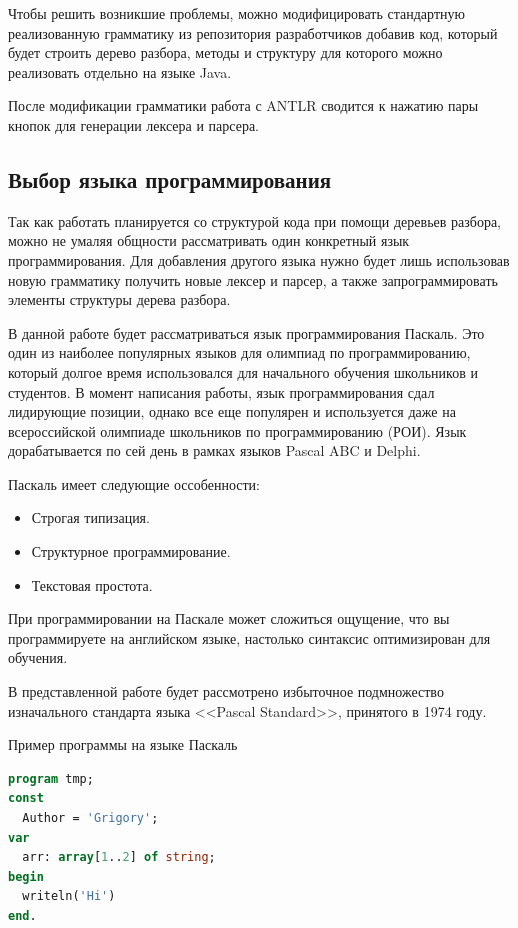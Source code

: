 Чтобы решить возникшие проблемы, можно модифицировать стандартную реализованную грамматику из репозитория разработчиков
добавив код, который будет строить дерево разбора, методы и структуру для которого можно реализовать отдельно на языке
Java.

После модификации грамматики работа с ANTLR сводится к нажатию пары кнопок для генерации лексера и парсера. 

\subsection{Выбор языка программирования}

Так как работать планируется со структурой кода при помощи деревьев разбора, можно не умаляя общности рассматривать один
конкретный язык программирования. Для добавления другого языка нужно будет лишь использовав новую грамматику получить новые лексер
и парсер, а также запрограммировать элементы структуры дерева разбора.

В данной работе будет рассматриваться язык программирования Паскаль. Это один из наиболее популярных языков для олимпиад
по программированию, который долгое время использовался для начального обучения школьников и студентов. В момент написания
работы, язык программирования сдал лидирующие позиции, однако все еще популярен и используется даже на всероссийской олимпиаде
школьников по программированию (РОИ). Язык дорабатывается по сей день в рамках языков Pascal ABC и Delphi.

Паскаль имеет следующие оссобенности:
\begin{itemize}
    \item Строгая типизация.
    \item Структурное программирование.
    \item Текстовая простота.
\end{itemize}

При программировании на Паскале может сложиться ощущение, что вы программируете на английском языке, настолько синтаксис оптимизирован
для обучения.

В представленной работе будет рассмотрено избыточное подмножество изначального стандарта языка 
<<Pascal Standard>>, принятого в 1974 году.

\begin{algorithm}[!h] 
\caption{Пример программы на языке Паскаль}\label{lst1} 
\begin{lstlisting}[language=pascal]
program tmp;
const
  Author = 'Grigory';
var
  arr: array[1..2] of string;
begin
  writeln('Hi')
end.
\end{lstlisting} 
\end{algorithm}

